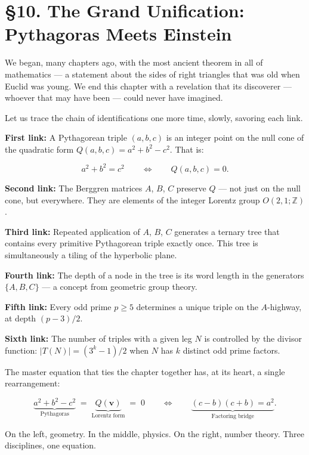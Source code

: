 \section{§10. The Grand Unification: Pythagoras Meets Einstein}\label{ch16-the-grand-unification-pythagoras-meets-einstein}

We began, many chapters ago, with the most ancient theorem in all of mathematics --- a statement about the sides of right triangles that was old when Euclid was young. We end this chapter with a revelation that its discoverer --- whoever that may have been --- could never have imagined.

Let us trace the chain of identifications one more time, slowly, savoring each link.

\textbf{First link:} A Pythagorean triple \((a, b, c)\) is an integer point on the null cone of the quadratic form \(Q(a, b, c) = a^2 + b^2 - c^2\). That is:

\[a^2 + b^2 = c^2 \qquad\Longleftrightarrow\qquad Q(a, b, c) = 0.\]

\textbf{Second link:} The Berggren matrices \(A\), \(B\), \(C\) preserve \(Q\) --- not just on the null cone, but everywhere. They are elements of the integer Lorentz group \(O(2,1; \mathbb{Z})\).

\textbf{Third link:} Repeated application of \(A\), \(B\), \(C\) generates a ternary tree that contains every primitive Pythagorean triple exactly once. This tree is simultaneously a tiling of the hyperbolic plane.

\textbf{Fourth link:} The depth of a node in the tree is its word length in the generators \(\{A, B, C\}\) --- a concept from geometric group theory.

\textbf{Fifth link:} Every odd prime \(p \geq 5\) determines a unique triple on the \(A\)-highway, at depth \((p - 3)/2\).

\textbf{Sixth link:} The number of triples with a given leg \(N\) is controlled by the divisor function: \(|T(N)| = (3^k - 1)/2\) when \(N\) has \(k\) distinct odd prime factors.

The master equation that ties the chapter together has, at its heart, a single rearrangement:

\[\underbrace{a^2 + b^2 - c^2}_{\text{Pythagoras}} \;=\; \underbrace{Q(\mathbf{v})}_{\text{Lorentz form}} \;=\; 0 \qquad\Longleftrightarrow\qquad \underbrace{(c - b)(c + b) = a^2}_{\text{Factoring bridge}}.\]

On the left, geometry. In the middle, physics. On the right, number theory. Three disciplines, one equation.


